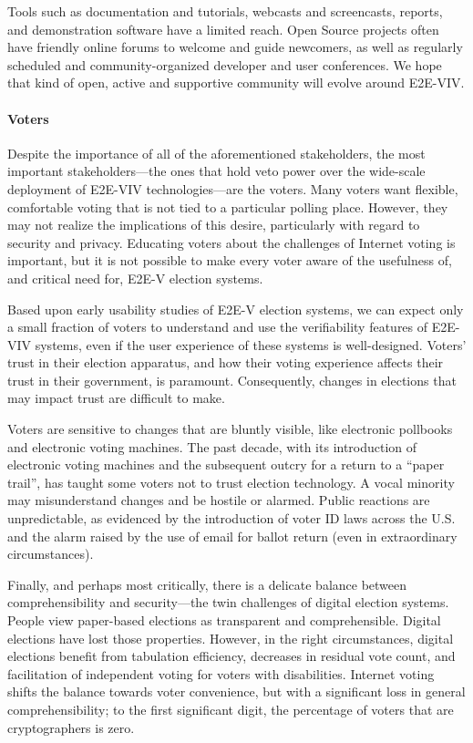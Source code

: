 Tools such as documentation and tutorials, webcasts and screencasts,
reports, and demonstration software have a limited reach. Open Source
projects often have friendly online forums to welcome and guide
newcomers, as well as regularly scheduled and community-organized
developer and user conferences. We hope that kind of open, active and
supportive community will evolve around E2E-VIV.

\paragraph{Voters} 
Despite the importance of all of the aforementioned stakeholders, the
most important stakeholders---the ones that hold veto power over the
wide-scale deployment of E2E-VIV technologies---are the voters. Many
voters want flexible, comfortable voting that is not tied to a
particular polling place. However, they may not realize the
implications of this desire, particularly with regard to security and
privacy. Educating voters about the challenges of Internet voting is
important, but it is not possible to make every voter aware of the
usefulness of, and critical need for, E2E-V election systems.

Based upon early usability studies of E2E-V election systems, we can
expect only a small fraction of voters to understand and use the
verifiability features of E2E-VIV systems, even if the user experience
of these systems is well-designed. Voters’ trust in their election
apparatus, and how their voting experience affects their trust in
their government, is paramount. Consequently, changes in elections
that may impact trust are difficult to make.

Voters are sensitive to changes that are bluntly visible, like
electronic pollbooks and electronic voting machines. The past decade,
with its introduction of electronic voting machines and the subsequent
outcry for a return to a “paper trail”, has taught some voters not to
trust election technology. A vocal minority may misunderstand changes
and be hostile or alarmed. Public reactions are unpredictable, as
evidenced by the introduction of voter ID laws across the U.S. and the
alarm raised by the use of email for ballot return (even in
extraordinary circumstances).

Finally, and perhaps most critically, there is a delicate balance
between comprehensibility and security---the twin challenges of
digital election systems. People view paper-based elections as
transparent and comprehensible. Digital elections have lost those
properties. However, in the right circumstances, digital elections
benefit from tabulation efficiency, decreases in residual vote count,
and facilitation of independent voting for voters with
disabilities. Internet voting shifts the balance towards voter
convenience, but with a significant loss in general comprehensibility;
to the first significant digit, the percentage of voters that are
cryptographers is zero.

